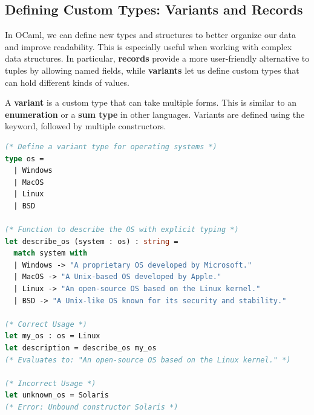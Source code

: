 \subsection{Defining Custom Types: Variants and Records}

In OCaml, we can define new types and structures to better organize our data and improve readability. This is especially useful when working with complex data structures. In particular, \textbf{records} provide a more user-friendly alternative to tuples by allowing named fields, while \textbf{variants} let us define custom types that can hold different kinds of values.

\vspace{2em}

\begin{Def}

A \textbf{variant} is a custom type that can take multiple forms. This is similar to an \textbf{enumeration} or a \textbf{sum type} in other languages. Variants are defined using the  keyword, followed by multiple constructors.

\begin{lstlisting}[language=OCaml, caption={Defining and Using Variants Correctly}, numbers=none]
(* Define a variant type for operating systems *)
type os =
  | Windows
  | MacOS
  | Linux
  | BSD

(* Function to describe the OS with explicit typing *)
let describe_os (system : os) : string =
  match system with
  | Windows -> "A proprietary OS developed by Microsoft."
  | MacOS -> "A Unix-based OS developed by Apple."
  | Linux -> "An open-source OS based on the Linux kernel."
  | BSD -> "A Unix-like OS known for its security and stability."

(* Correct Usage *)
let my_os : os = Linux
let description = describe_os my_os
(* Evaluates to: "An open-source OS based on the Linux kernel." *)

(* Incorrect Usage *)
let unknown_os = Solaris
(* Error: Unbound constructor Solaris *)
\end{lstlisting}
\end{Def}

\newpage

